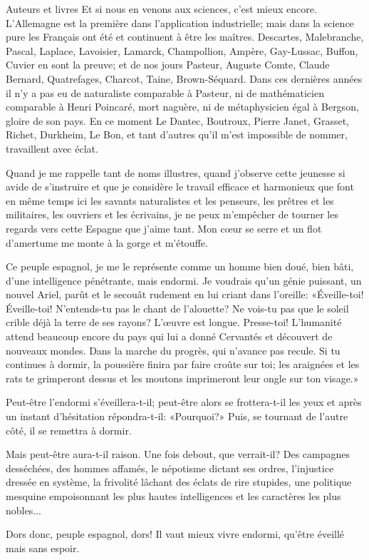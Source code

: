\begin{chapter}{Auteurs et livres}
Et si nous en venons aux sciences, c'est mieux encore. L'Allemagne est
la première dans l'application industrielle; mais dans la science pure
les Français ont été et continuent à être les maîtres. Descartes,
Malebranche, Pascal, Laplace, Lavoisier, Lamarck, Champollion, Ampère,
Gay-Lussac, Buffon, Cuvier en sont la preuve; et de nos jours Pasteur,
Auguste Comte, Claude Bernard, Quatrefages, Charcot, Taine,
Brown-Séquard. Dans ces dernières années il n'y a pas eu de naturaliste
comparable à Pasteur, ni de mathématicien comparable à Henri Poincaré,
mort naguère, ni de métaphysicien égal à Bergson, gloire de son pays. En
ce moment Le Dantec, Boutroux, Pierre Janet, Grasset, Richet, Durkheim,
Le Bon, et tant d'autres qu'il m'est impossible de nommer, travaillent
avec éclat.

Quand je me rappelle tant de noms illustres, quand j'observe cette
jeunesse si avide de s'instruire et que je considère le travail efficace
et harmonieux que font en même temps ici les savants naturalistes et les
penseurs, les prêtres et les militaires, les ouvriers et les écrivains,
je ne peux m'empêcher de tourner les regards vers cette Espagne que
j'aime tant. Mon cœur se serre et un flot d'amertume me monte à la
gorge et m'étouffe.

Ce peuple espagnol, je me le représente comme un homme bien doué, bien
bâti, d'une intelligence pénétrante, mais endormi. Je voudrais qu'un
génie puissant, un nouvel Ariel, parût et le secouât rudement en lui
criant dans l'oreille: «Éveille-toi! Éveille-toi! N'entends-tu pas le
chant de l'alouette? Ne vois-tu pas que le soleil crible déjà la terre
de ses rayons? L'œuvre est longue. Presse-toi! L'humanité attend
beaucoup encore du pays qui lui a donné Cervantés et découvert de
nouveaux mondes. Dans la marche du progrès, qui n'avance pas recule. Si
tu continues à dormir, la poussière finira par faire croûte sur toi; les
araignées et les rats te grimperont dessus et les moutons imprimeront
leur ongle sur ton visage.»

Peut-être l'endormi s'éveillera-t-il; peut-être alors se frottera-t-il
les yeux et après un instant d'hésitation répondra-t-il: «Pourquoi?»
Puis, se tournant de l'autre côté, il se remettra à dormir.

Mais peut-être aura-t-il raison. Une fois debout, que verrait-il? Des
campagnes desséchées, des hommes affamés, le népotisme dictant ses
ordres, l'injustice dressée en système, la frivolité lâchant des éclats
de rire stupides, une politique mesquine empoisonnant les plus hautes
intelligences et les caractères les plus nobles...

Dors donc, peuple espagnol, dors! Il vaut mieux vivre endormi, qu'être
éveillé mais sans espoir.

\end{chapter}


